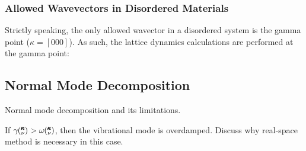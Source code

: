 \documentclass[aps,prb,preprint,superscriptaddress,amsmath,amssymb,floatfix]{revtex4}
\newcommand{\kv}{\mspace{-4.0mu}\left(\mspace{-8.0mu}
\begin{smallmatrix}&\pmb{\kappa} \\&\nu\end{smallmatrix}
\mspace{-3.0mu}\right)}
\begin{document}
\subsubsection*{Allowed Wavevectors in Disordered Materials}
Strictly speaking, the only allowed wavector in a disordered system is the 
gamma point ($\kappa = [0 0 0]$). As such, the lattice dynamics calculations 
are performed at the gamma point:
\subsection{\label{S:Lifetimes:}Normal Mode Decomposition}
Normal mode decomposition and its limitations.
\cite{turney_predicting_2009-1} 

If $\gamma \kv > \omega \kv$, then the vibrational mode is overdamped.  
Discuss why real-space method is necessary in this case.
\end{document}
